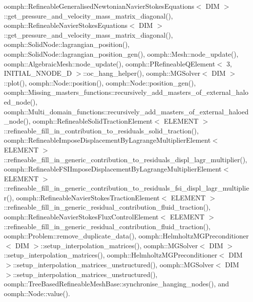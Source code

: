 oomph\+::\+Refineable\+Generalised\+Newtonian\+Navier\+Stokes\+Equations$<$ D\+I\+M $>$\+::get\+\_\+pressure\+\_\+and\+\_\+velocity\+\_\+mass\+\_\+matrix\+\_\+diagonal(), oomph\+::\+Refineable\+Navier\+Stokes\+Equations$<$ D\+I\+M $>$\+::get\+\_\+pressure\+\_\+and\+\_\+velocity\+\_\+mass\+\_\+matrix\+\_\+diagonal(), oomph\+::\+Solid\+Node\+::lagrangian\+\_\+position(), oomph\+::\+Solid\+Node\+::lagrangian\+\_\+position\+\_\+gen(), oomph\+::\+Mesh\+::node\+\_\+update(), oomph\+::\+Algebraic\+Mesh\+::node\+\_\+update(), oomph\+::\+P\+Refineable\+Q\+Element$<$ 3, I\+N\+I\+T\+I\+A\+L\+\_\+\+N\+N\+O\+D\+E\+\_\+D $>$\+::oc\+\_\+hang\+\_\+helper(), oomph\+::\+M\+G\+Solver$<$ D\+I\+M $>$\+::plot(), oomph\+::\+Node\+::position(), oomph\+::\+Node\+::position\+\_\+gen(), oomph\+::\+Missing\+\_\+masters\+\_\+functions\+::recursively\+\_\+add\+\_\+masters\+\_\+of\+\_\+external\+\_\+haloed\+\_\+node(), oomph\+::\+Multi\+\_\+domain\+\_\+functions\+::recursively\+\_\+add\+\_\+masters\+\_\+of\+\_\+external\+\_\+haloed\+\_\+node(), oomph\+::\+Refineable\+Solid\+Traction\+Element$<$ E\+L\+E\+M\+E\+N\+T $>$\+::refineable\+\_\+fill\+\_\+in\+\_\+contribution\+\_\+to\+\_\+residuals\+\_\+solid\+\_\+traction(), oomph\+::\+Refineable\+Impose\+Displacement\+By\+Lagrange\+Multiplier\+Element$<$ E\+L\+E\+M\+E\+N\+T $>$\+::refineable\+\_\+fill\+\_\+in\+\_\+generic\+\_\+contribution\+\_\+to\+\_\+residuals\+\_\+displ\+\_\+lagr\+\_\+multiplier(), oomph\+::\+Refineable\+F\+S\+I\+Impose\+Displacement\+By\+Lagrange\+Multiplier\+Element$<$ E\+L\+E\+M\+E\+N\+T $>$\+::refineable\+\_\+fill\+\_\+in\+\_\+generic\+\_\+contribution\+\_\+to\+\_\+residuals\+\_\+fsi\+\_\+displ\+\_\+lagr\+\_\+multiplier(), oomph\+::\+Refineable\+Navier\+Stokes\+Traction\+Element$<$ E\+L\+E\+M\+E\+N\+T $>$\+::refineable\+\_\+fill\+\_\+in\+\_\+generic\+\_\+residual\+\_\+contribution\+\_\+fluid\+\_\+traction(), oomph\+::\+Refineable\+Navier\+Stokes\+Flux\+Control\+Element$<$ E\+L\+E\+M\+E\+N\+T $>$\+::refineable\+\_\+fill\+\_\+in\+\_\+generic\+\_\+residual\+\_\+contribution\+\_\+fluid\+\_\+traction(), oomph\+::\+Problem\+::remove\+\_\+duplicate\+\_\+data(), oomph\+::\+Helmholtz\+M\+G\+Preconditioner$<$ D\+I\+M $>$\+::setup\+\_\+interpolation\+\_\+matrices(), oomph\+::\+M\+G\+Solver$<$ D\+I\+M $>$\+::setup\+\_\+interpolation\+\_\+matrices(), oomph\+::\+Helmholtz\+M\+G\+Preconditioner$<$ D\+I\+M $>$\+::setup\+\_\+interpolation\+\_\+matrices\+\_\+unstructured(), oomph\+::\+M\+G\+Solver$<$ D\+I\+M $>$\+::setup\+\_\+interpolation\+\_\+matrices\+\_\+unstructured(), oomph\+::\+Tree\+Based\+Refineable\+Mesh\+Base\+::synchronise\+\_\+hanging\+\_\+nodes(), and oomph\+::\+Node\+::value().


